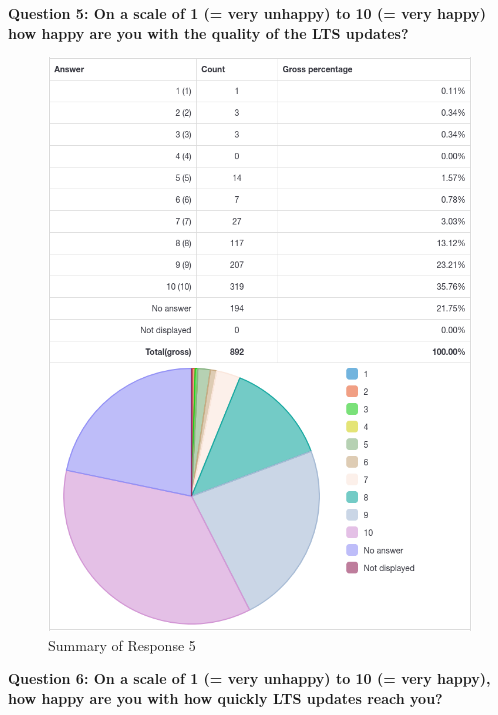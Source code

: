 \documentclass{article}
\begin{document}
\newpage

\large{\textbf{Question 5: On a scale of 1 (= very unhappy) to 10 (= very happy) how happy are you with
the quality of the LTS updates?}}

\vspace{3mm}
\begin{figure}[h!]
\centering
\includegraphics[width=15.6cm]{assets/5-complete-responses.png}
\caption{Summary of Response 5}
\end{figure}

\newpage

\large{\textbf{Question 6: On a scale of 1 (= very unhappy) to 10 (= very happy), how happy are you with
how quickly LTS updates reach you?}}
\end{document}
